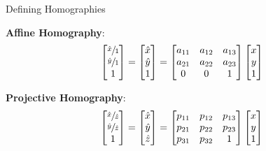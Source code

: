 \documentclass[serif]{beamer}
\begin{document}



\begin{frame}[c]{\sc Defining Homographies}

\textbf{Affine Homography}:
\begin{equation}
\label{AffineHomographySolve}
\begin{bmatrix}\sfrac{\hat{x}}{1}\\\sfrac{\hat{y}}{1}\\1\end{bmatrix}=\begin{bmatrix}\hat{x}\\\hat{y}\\1\end{bmatrix}=\begin{bmatrix}a_{11}&a_{12}&a_{13}\\a_{21}&a_{22}&a_{23}\\0&0&1\end{bmatrix}\begin{bmatrix}x\\y\\1\end{bmatrix}
\end{equation}

\vfill

\textbf{Projective Homography}:
\begin{equation}
\label{ProjectiveHomographySolve}
\begin{bmatrix}\sfrac{\hat{x}}{\hat{z}}\\\sfrac{\hat{y}}{\hat{z}}\\1\end{bmatrix}=\begin{bmatrix}\hat{x}\\\hat{y}\\\hat{z}\end{bmatrix}=\begin{bmatrix}p_{11}&p_{12}&p_{13}\\p_{21}&p_{22}&p_{23}\\p_{31}&p_{32}&1\end{bmatrix}\begin{bmatrix}x\\y\\1\end{bmatrix}
\end{equation}

\end{frame}
\end{document}
